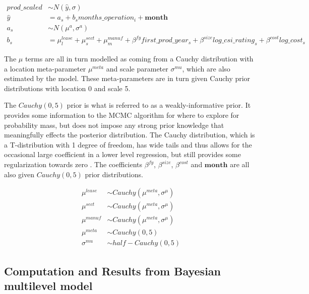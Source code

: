 \documentclass[12pt]{article}
\begin{document}
\begin{equation}
\begin{aligned}
prod\_scaled &\sim N(\hat{y}, \sigma)\\ %
\hat{y} &= a_s + b_s months\_operation_i + \mathbf{month}\\ \label{eqn:bayesMod}
a_s &\sim N(\mu^a, \sigma^a) \\
b_s & = \mu^{lease}_l + \mu^{sect}_s + \mu^{manuf}_m + \beta^{fy} first\_prod\_year_s + \beta^{size} log\_csi\_rating_s + \beta^{cost} log\_cost_s
\end{aligned}
\end{equation}

The $\mu$ terms are all in turn modelled as coming from a Cauchy distribution with a location meta-parameter $\mu^{meta}$ and scale parameter $\sigma^{mu}$, which are also estimated by the model. These meta-parameters are in turn given Cauchy prior distributions with location 0 and scale 5.

The $Cauchy(0,5)$ prior is what is referred to as a weakly-informative prior. It provides some information to the MCMC algorithm for where to explore for probability mass, but does not impose any strong prior knowledge that meaningfully effects the posterior distribution. The Cauchy distribution, which is a T-distribution with 1 degree of freedom, has wide tails and thus allows for the occasional large coefficient in a lower level regression, but still provides some regularization towards zero \citep{gelman_weakly_2008}.  The coefficients $\beta^{fy}$, $\beta^{size}$, $\beta^{cost}$ and $\mathbf{month}$ are all also given $Cauchy(0,5)$ prior distributions.

\begin{equation}
\begin{aligned}
\mu^{lease} &\sim Cauchy(\mu^{meta}, \sigma^{\mu}) \\ %
\mu^{sect} &\sim Cauchy(\mu^{meta}, \sigma^{\mu}) \\ %
\mu^{manuf} &\sim Cauchy(\mu^{meta}, \sigma^{\mu}) \label{eqn:meta} \\ %
\mu^{meta} &\sim Cauchy(0, 5) \\ %
\sigma^{mu} &\sim half-Cauchy(0,5) %
\end{aligned}
\end{equation}

\subsection{Computation and Results from Bayesian multilevel model}
\end{document}
